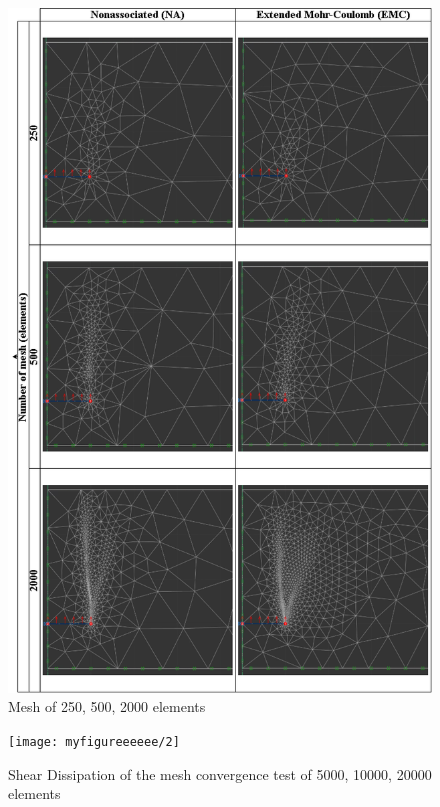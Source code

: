 \documentclass[a4paper, nobind]{templates/ociamthesis}
\begin{document}
\begin{figure}[H]
\includegraphics[width=1\linewidth]{myfigureeeeee/4} \caption{Mesh of 250, 500, 2000 elements}\label{fig:unnamed-chunk-16}
\end{figure}

\begin{figure}[H]
\texttt{[image: myfigureeeeee/2]} \caption{Shear Dissipation of the mesh convergence test of 5000, 10000, 20000 elements}\label{fig:unnamed-chunk-17}
\end{figure}
\end{document}
